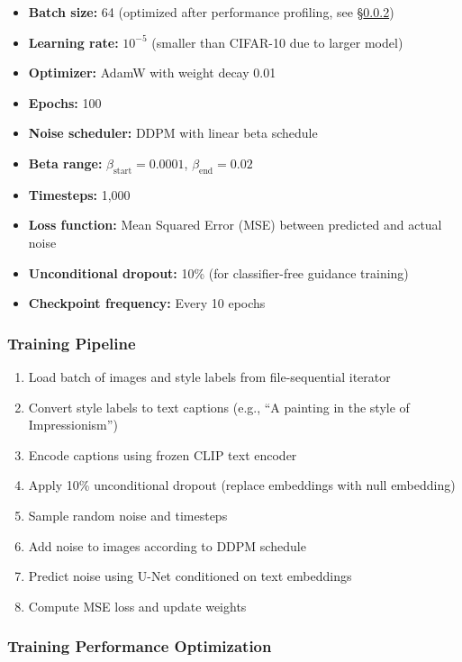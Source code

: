\begin{itemize}
    \item \textbf{Batch size:} 64 (optimized after performance profiling, see \S\ref{sec:wikiart-optimization})
    \item \textbf{Learning rate:} $10^{-5}$ (smaller than CIFAR-10 due to larger model)
    \item \textbf{Optimizer:} AdamW with weight decay 0.01
    \item \textbf{Epochs:} 100
    \item \textbf{Noise scheduler:} DDPM with linear beta schedule
    \item \textbf{Beta range:} $\beta_{\text{start}} = 0.0001$, $\beta_{\text{end}} = 0.02$
    \item \textbf{Timesteps:} 1,000
    \item \textbf{Loss function:} Mean Squared Error (MSE) between predicted and actual noise
    \item \textbf{Unconditional dropout:} 10\% (for classifier-free guidance training)
    \item \textbf{Checkpoint frequency:} Every 10 epochs
\end{itemize}

\subsubsection{Training Pipeline}

\begin{enumerate}
    \item Load batch of images and style labels from file-sequential iterator
    \item Convert style labels to text captions (e.g., ``A painting in the style of Impressionism'')
    \item Encode captions using frozen CLIP text encoder
    \item Apply 10\% unconditional dropout (replace embeddings with null embedding)
    \item Sample random noise and timesteps
    \item Add noise to images according to DDPM schedule
    \item Predict noise using U-Net conditioned on text embeddings
    \item Compute MSE loss and update weights
\end{enumerate}

\subsubsection{Training Performance Optimization}
\label{sec:wikiart-optimization}

